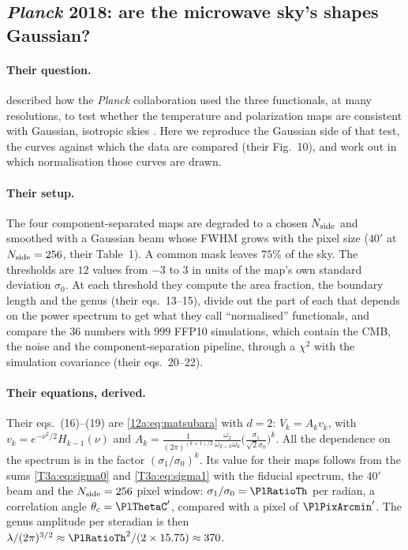 \subsection{\textit{Planck} 2018: are the microwave sky's shapes Gaussian?}
\label{12a:sec:planck}

\paragraph{Their question.}  described how the \textit{Planck} collaboration used the
three functionals, at many resolutions, to test whether the temperature and polarization maps are consistent
with Gaussian, isotropic skies \cite{Planck2018VII}. Here we reproduce the Gaussian side of that test, the
curves against which the data are compared (their Fig.~10), and work out in which normalisation those curves are
drawn.

\paragraph{Their setup.} The four component-separated maps are degraded to a chosen $N_{\rm side}$ and smoothed
with a Gaussian beam whose FWHM grows with the pixel size ($40'$ at $N_{\rm side}=256$, their Table~1). A common
mask leaves $75\%$ of the sky. The thresholds are $12$ values from $-3$ to $3$ in units of the map's own standard
deviation $\sigma_0$. At each threshold they compute the area fraction, the boundary length and the genus
(their eqs.~13--15), divide out the part of each that depends on the power spectrum to get what they call
``normalised'' functionals, and compare the $36$ numbers with $999$ FFP10 simulations, which contain the CMB, the noise and the component-separation
pipeline, through a $\chi^2$ with the simulation covariance (their eqs.~20--22).

\paragraph{Their equations, derived.} Their eqs.~(16)--(19) are \eqref{12a:eq:matsubara} with $d=2$:
$V_k=A_kv_k$, with $v_k=e^{-\nu^2/2}H_{k-1}(\nu)$ and
$A_k=\frac{1}{(2\pi)^{(k+1)/2}}\frac{\omega_2}{\omega_{2-k}\omega_k}\big(\frac{\sigma_1}{\sqrt2\sigma_0}\big)^k$. All
the dependence on the spectrum is in the factor $(\sigma_1/\sigma_0)^k$. Its value for their maps follows from the
sums \eqref{T3a:eq:sigma0} and \eqref{T3a:eq:sigma1} with the fiducial spectrum, the $40'$ beam and the
$N_{\rm side}=256$ pixel window: $\sigma_1/\sigma_0=\PlRatioTh$ per radian, a correlation angle
$\theta_c=\PlThetaC'$, compared with a pixel of $\PlPixArcmin'$. The genus amplitude per steradian is then
$\lambda/(2\pi)^{3/2}\approx\PlRatioTh^2/(2\times15.75)\approx370$.

